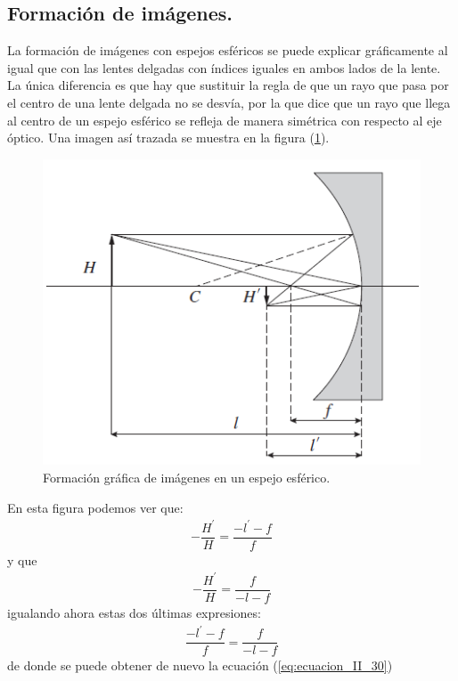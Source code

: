 \documentclass[14pt]{extarticle}
\begin{document}
\subsection{Formación de imágenes.}

La formación de imágenes con espejos esféricos se puede explicar gráficamente al igual que con las lentes delgadas con índices iguales en ambos lados de la lente. La única diferencia es que hay que sustituir la regla de que un rayo que pasa por el centro de una lente delgada no se desvía, por la que dice que un rayo que llega al centro de un espejo esférico se refleja de manera simétrica con respecto al eje óptico. Una imagen así trazada se muestra en la figura (\ref{fig:figura_II_12}).
\begin{figure}[H]
    \centering
    \includegraphics[scale=0.8]{Imagenes/Lentes_13.png}
    \caption{Formación gráfica de imágenes en un espejo esférico.}
    \label{fig:figura_II_12}
\end{figure}
En esta figura podemos ver que:
\begin{align}
- \dfrac{H^{\prime}}{H} = \dfrac{- l^{\prime} - f}{f}
\label{eq:ecuacion_II_31}
\end{align}
y que
\begin{align}
- \dfrac{H^{\prime}}{H} = \dfrac{f}{- l - f}
\label{eq:ecuacion_II_32}
\end{align}
igualando ahora estas dos últimas expresiones:
\begin{align}
\dfrac{- l^{\prime} - f}{f} = \dfrac{f}{- l - f}
\label{eq:ecuacion_II_33}
\end{align}
de donde se puede obtener de nuevo la ecuación (\ref{eq:ecuacion_II_30})
\end{document}

